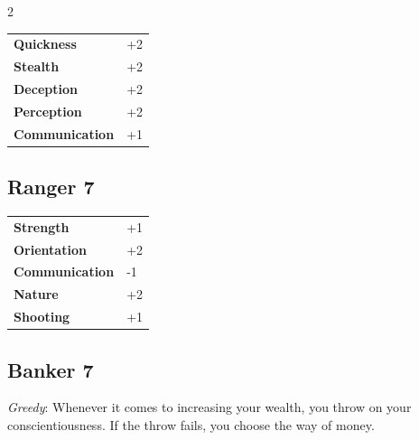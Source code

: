 \begin{multicols}{2}
\begin{tcolorbox}
\vspace{3mm}

\begin{tabular}{@{}ll@{}}
    \textbf{Quickness} & +2\\
    \textbf{Stealth} & +2\\
    \textbf{Deception} & +2\\
    \textbf{Perception} & +2\\
    \textbf{Communication} & +1\\
\end{tabular}


\end{tcolorbox}

\begin{tcolorbox}
    \subsection*{Ranger \hfill \small{7 }}
    \tcblower




\begin{tabular}{@{}ll@{}}
    \textbf{Strength} & +1\\
    \textbf{Orientation} & +2\\
    \textbf{Communication} & -1\\
    \textbf{Nature} & +2\\
    \textbf{Shooting} & +1\\
\end{tabular}


\end{tcolorbox}

\begin{tcolorbox}
    \subsection*{Banker \hfill \small{7 }}
    \tcblower
\textit{Greedy}: Whenever it comes to increasing your wealth, you throw on your conscientiousness. If the throw fails, you choose the way of money.


\vspace{3mm}


\end{tcolorbox}
\end{multicols}
